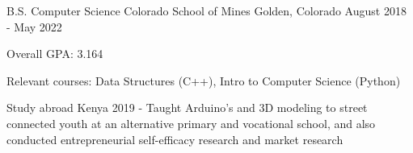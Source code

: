 

\begin{cventries}

  \cventry
    {B.S. Computer Science}
    {Colorado School of Mines} %
    {Golden, Colorado} %
    {August 2018 - May 2022} %
    {
      \begin{cvitems} %
        \item {Overall GPA: 3.164}
        \item {Relevant courses: Data Structures (C++), Intro to Computer Science
    (Python)}
   \item {Study abroad Kenya 2019 - Taught Arduino's and 3D modeling
    to street connected youth at an alternative primary and vocational
    school, and also
    conducted entrepreneurial self-efficacy research and market research}
      \end{cvitems}
    }
    

\end{cventries}

